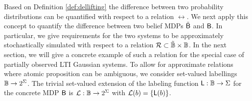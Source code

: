 \documentclass{ifacconf}
\begin{document}


Based on Definition \ref{def:dellifting} the difference between two probability distributions can be quantified with respect to a relation $\rel$. We next apply this concept to quantify the difference between two belief MDPs $\tilde {\mathsf{B}}$ and $\mathsf{B}$. In particular, we give requirements for the two systems  to be approximately stochastically simulated with respect to a relation $\mathcal{R}\subset \tilde {\mathbb{B}} \times \mathbb{B}$. In the next section, we will give a concrete example of such a relation for the special case of partially observed LTI Gaussian systems. To allow for approximate relations where atomic proposition can be ambiguous, we consider set-valued labellings $\mathbb{B}\rightarrow2^\Sigma$. The trivial set-valued extension of the labeling function $\mathsf{L} : \mathbb{B} \rightarrow \Sigma$ for the concrete MDP $\mathsf{B}$ is $\mathcal{L}: \mathbb{B} \rightarrow2^\Sigma$ with $\mathcal{L}(b)=\{\mathsf{L}(b)\}$.
\end{document}
